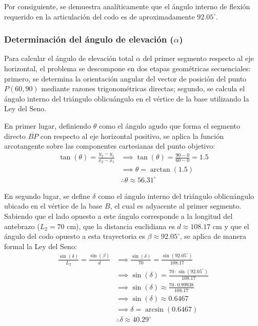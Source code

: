 \documentclass[12pt]{article}
\begin{document}
Por consiguiente, se demuestra analíticamente que el ángulo interno de flexión requerido en la articulación del codo es de aproximadamente $92.05^\circ$.

\subsubsection{Determinación del ángulo de elevación ($\alpha$)}

Para calcular el ángulo de elevación total $\alpha$ del primer segmento respecto al eje horizontal, el problema se descompone en dos etapas geométricas secuenciales: primero, se determina la orientación angular del vector de posición del punto $P(60,90)$ mediante razones trigonométricas directas; segundo, se calcula el ángulo interno del triángulo oblicuángulo en el vértice de la base utilizando la Ley del Seno.

\newpage

En primer lugar, definiendo $\theta$ como el ángulo agudo que forma el segmento directo $\overline{BP}$ con respecto al eje horizontal positivo, se aplica la función arcotangente sobre las componentes cartesianas del punto objetivo:
\begin{align*}
    \tan(\theta) = \frac{y_2 - y_1}{x_2 - x_1} &\implies \tan(\theta) = \frac{90 - 0}{60 - 0} = 1.5 \\
    &\implies \theta = \arctan(1.5) \\
    &\therefore \theta \approx 56.31^\circ
    \end{align*}

En segundo lugar, se define $\delta$ como el ángulo interno del triángulo oblicuángulo ubicado en el vértice de la base $B$, el cual es adyacente al primer segmento. Sabiendo que el lado opuesto a este ángulo corresponde a la longitud del antebrazo ($L_2 = 70 \text{ cm}$), que la distancia euclidiana es $d \approx 108.17 \text{ cm}$ y que el ángulo del codo opuesto a esta trayectoria es $\beta \approx 92.05^\circ$, se aplica de manera formal la Ley del Seno:
\begin{align*}
    \frac{\sin(\delta)}{L_2} = \frac{\sin(\beta)}{d} &\implies \frac{\sin(\delta)}{70} = \frac{\sin(92.05^\circ)}{108.17} \\
    &\implies \sin(\delta) = \frac{70 \cdot \sin(92.05^\circ)}{108.17} \\
    &\implies \sin(\delta) \approx \frac{70 \cdot 0.99938}{108.17} \\
    &\implies \sin(\delta) \approx 0.6467 \\
    &\implies \delta = \arcsin(0.6467) \\
    &\therefore \delta \approx 40.29^\circ
\end{align*}
\end{document}
